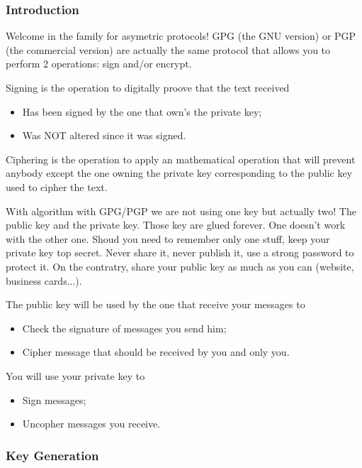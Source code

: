 

\subsubsection{Introduction}

Welcome in the family for asymetric protocols!  GPG (the GNU version) or PGP (the commercial version) are actually the same protocol that allows you to perform 2 operations: sign and/or encrypt.

Signing is the operation to digitally proove that the text received
\begin{itemize}
    \item Has been signed by the one that own's the private key;
    \item Was NOT altered since it was signed.
\end{itemize}

Ciphering is the operation to apply an mathematical operation that will prevent anybody except the one owning the private key corresponding to the public key used to cipher the text.

With algorithm with GPG/PGP we are not using one key but actually two!  The public key and the private key.  Those key are glued forever.  One doesn't work with the other one.  Shoud you need to remember only one stuff, keep your private key top secret.  Never share it, never publish it, use a strong password to protect it.  On the contratry, share your public key as much as you can (website, business cards...).

The public key will be used by the one that receive your messages to
\begin{itemize}
    \item Check the signature of messages you send him;
    \item Cipher message that should be received by you and only you.
\end{itemize}

You will use your private key to
\begin{itemize}
    \item Sign messages;
    \item Uncopher messages you receive.
\end{itemize}


\subsubsection{Key Generation}

